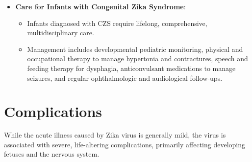 \begin{itemize}
\begin{itemize}
        \item Management of GBS includes supportive care (respiratory support, physical therapy) and specific treatments such as intravenous immunoglobulin (IVIG) therapy or plasmapheresis (plasma exchange) to reduce the severity and duration of the autoimmune attack.
    \end{itemize}
    \item \textbf{Care for Infants with Congenital Zika Syndrome}:
    \begin{itemize}
        \item Infants diagnosed with CZS require lifelong, comprehensive, multidisciplinary care.
        \item Management includes developmental pediatric monitoring, physical and occupational therapy to manage hypertonia and contractures, speech and feeding therapy for dysphagia, anticonvulsant medications to manage seizures, and regular ophthalmologic and audiological follow-ups.
    \end{itemize}
\end{itemize}

\section*{Complications}
While the acute illness caused by Zika virus is generally mild, the virus is associated with severe, life-altering complications, primarily affecting developing fetuses and the nervous system.


